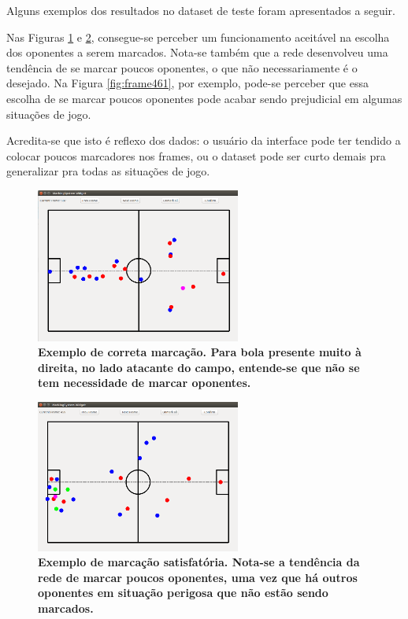 \documentclass[10pt,fleqn,a4paper]{article}
\begin{document}
	Alguns exemplos dos resultados no dataset de teste foram apresentados a seguir.

	Nas Figuras \ref{fig:frame507} e \ref{fig:frame459}, consegue-se perceber um funcionamento aceitável na escolha dos oponentes a serem marcados. Nota-se também que a rede desenvolveu uma tendência de se marcar poucos oponentes, o que não necessariamente é o desejado. Na Figura \ref{fig:frame461}, por exemplo, pode-se perceber que essa escolha de se marcar poucos oponentes pode acabar sendo prejudicial em algumas situações de jogo.
	
	Acredita-se que isto é reflexo dos dados: o usuário da interface pode ter tendido a colocar poucos marcadores nos frames, ou o dataset pode ser curto demais pra generalizar pra todas as situações de jogo. 
	
\begin{figure}[H]
	\centering
	\includegraphics[width=0.6\textwidth]{figures/frame507.png}
   \caption{\textbf{Exemplo de correta marcação. Para bola presente muito à direita, no lado atacante do campo, entende-se que não se tem necessidade de marcar oponentes.}} \label{fig:frame507}
\end{figure}

\begin{figure}[H]
	\centering
	\includegraphics[width=0.6\textwidth]{figures/frame459.png}
   \caption{\textbf{Exemplo de marcação satisfatória. Nota-se a tendência da rede de marcar poucos oponentes, uma vez que há outros oponentes em situação perigosa que não estão sendo marcados.}} \label{fig:frame459}
\end{figure}
\end{document}
